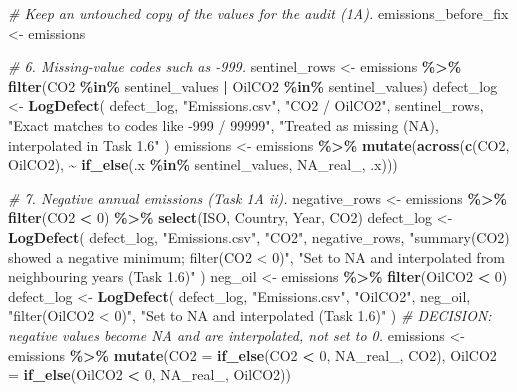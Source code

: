 \documentclass[
]{article}
\newenvironment{Shaded}{\begin{snugshade}}{\end{snugshade}}
\newcommand{\AttributeTok}[1]{\textcolor[rgb]{0.13,0.29,0.53}{#1}}
\newcommand{\CommentTok}[1]{\textcolor[rgb]{0.56,0.35,0.01}{\textit{#1}}}
\newcommand{\ConstantTok}[1]{\textcolor[rgb]{0.56,0.35,0.01}{#1}}
\newcommand{\DecValTok}[1]{\textcolor[rgb]{0.00,0.00,0.81}{#1}}
\newcommand{\FunctionTok}[1]{\textcolor[rgb]{0.13,0.29,0.53}{\textbf{#1}}}
\newcommand{\NormalTok}[1]{#1}
\newcommand{\OtherTok}[1]{\textcolor[rgb]{0.56,0.35,0.01}{#1}}
\newcommand{\SpecialCharTok}[1]{\textcolor[rgb]{0.81,0.36,0.00}{\textbf{#1}}}
\newcommand{\StringTok}[1]{\textcolor[rgb]{0.31,0.60,0.02}{#1}}
\begin{document}
\begin{Shaded}
\begin{Highlighting}[]
\CommentTok{\# Keep an untouched copy of the values for the audit (1A).}
\NormalTok{emissions\_before\_fix }\OtherTok{\textless{}{-}}\NormalTok{ emissions}

\CommentTok{\# 6. Missing{-}value codes such as {-}999.}
\NormalTok{sentinel\_rows }\OtherTok{\textless{}{-}}\NormalTok{ emissions }\SpecialCharTok{\%\textgreater{}\%}
  \FunctionTok{filter}\NormalTok{(CO2 }\SpecialCharTok{\%in\%}\NormalTok{ sentinel\_values }\SpecialCharTok{|}\NormalTok{ OilCO2 }\SpecialCharTok{\%in\%}\NormalTok{ sentinel\_values)}
\NormalTok{defect\_log }\OtherTok{\textless{}{-}} \FunctionTok{LogDefect}\NormalTok{(}
\NormalTok{  defect\_log, }\StringTok{"Emissions.csv"}\NormalTok{, }\StringTok{"CO2 / OilCO2"}\NormalTok{, sentinel\_rows,}
  \StringTok{"Exact matches to codes like {-}999 / 99999"}\NormalTok{,}
  \StringTok{"Treated as missing (NA), interpolated in Task 1.6"}
\NormalTok{)}
\NormalTok{emissions }\OtherTok{\textless{}{-}}\NormalTok{ emissions }\SpecialCharTok{\%\textgreater{}\%}
  \FunctionTok{mutate}\NormalTok{(}\FunctionTok{across}\NormalTok{(}\FunctionTok{c}\NormalTok{(CO2, OilCO2), }\SpecialCharTok{\textasciitilde{}} \FunctionTok{if\_else}\NormalTok{(.x }\SpecialCharTok{\%in\%}\NormalTok{ sentinel\_values,}
                                          \ConstantTok{NA\_real\_}\NormalTok{, .x)))}

\CommentTok{\# 7. Negative annual emissions (Task 1A ii).}
\NormalTok{negative\_rows }\OtherTok{\textless{}{-}}\NormalTok{ emissions }\SpecialCharTok{\%\textgreater{}\%}
  \FunctionTok{filter}\NormalTok{(CO2 }\SpecialCharTok{\textless{}} \DecValTok{0}\NormalTok{) }\SpecialCharTok{\%\textgreater{}\%}
  \FunctionTok{select}\NormalTok{(ISO, Country, Year, CO2)}
\NormalTok{defect\_log }\OtherTok{\textless{}{-}} \FunctionTok{LogDefect}\NormalTok{(}
\NormalTok{  defect\_log, }\StringTok{"Emissions.csv"}\NormalTok{, }\StringTok{"CO2"}\NormalTok{, negative\_rows,}
  \StringTok{"summary(CO2) showed a negative minimum; filter(CO2 \textless{} 0)"}\NormalTok{,}
  \StringTok{"Set to NA and interpolated from neighbouring years (Task 1.6)"}
\NormalTok{)}
\NormalTok{neg\_oil }\OtherTok{\textless{}{-}}\NormalTok{ emissions }\SpecialCharTok{\%\textgreater{}\%} \FunctionTok{filter}\NormalTok{(OilCO2 }\SpecialCharTok{\textless{}} \DecValTok{0}\NormalTok{)}
\NormalTok{defect\_log }\OtherTok{\textless{}{-}} \FunctionTok{LogDefect}\NormalTok{(}
\NormalTok{  defect\_log, }\StringTok{"Emissions.csv"}\NormalTok{, }\StringTok{"OilCO2"}\NormalTok{, neg\_oil,}
  \StringTok{"filter(OilCO2 \textless{} 0)"}\NormalTok{, }\StringTok{"Set to NA and interpolated (Task 1.6)"}
\NormalTok{)}
\CommentTok{\# DECISION: negative values become NA and are interpolated, not set to 0.}
\NormalTok{emissions }\OtherTok{\textless{}{-}}\NormalTok{ emissions }\SpecialCharTok{\%\textgreater{}\%}
  \FunctionTok{mutate}\NormalTok{(}\AttributeTok{CO2 =} \FunctionTok{if\_else}\NormalTok{(CO2 }\SpecialCharTok{\textless{}} \DecValTok{0}\NormalTok{, }\ConstantTok{NA\_real\_}\NormalTok{, CO2),}
         \AttributeTok{OilCO2 =} \FunctionTok{if\_else}\NormalTok{(OilCO2 }\SpecialCharTok{\textless{}} \DecValTok{0}\NormalTok{, }\ConstantTok{NA\_real\_}\NormalTok{, OilCO2))}


\end{Highlighting}
\end{Shaded}
\end{document}
